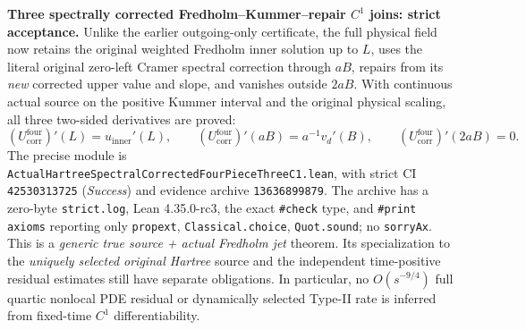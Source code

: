 \documentclass[11pt]{amsart}
\begin{document}
\medskip
\noindent\textbf{Three spectrally corrected Fredholm--Kummer--repair
$C^1$ joins: strict acceptance.}
Unlike the earlier outgoing-only certificate, the full physical field
now retains the original weighted Fredholm inner solution up to $L$,
uses the literal original zero-left Cramer spectral correction through
$aB$, repairs from its \emph{new} corrected upper value and slope, and
vanishes outside $2aB$. With continuous actual source on the positive
Kummer interval and the original physical scaling, all three
two-sided derivatives are proved:
\[
 \left(U_{\mathrm{corr}}^{\mathrm{four}}\right)'(L)
    =u_{\mathrm{inner}}'(L),\qquad
 \left(U_{\mathrm{corr}}^{\mathrm{four}}\right)'(aB)
    =a^{-1}v_d'(B),\qquad
 \left(U_{\mathrm{corr}}^{\mathrm{four}}\right)'(2aB)=0.
\]
The precise module is
\texttt{ActualHartreeSpectralCorrectedFourPieceThreeC1.lean},
with strict CI \texttt{42530313725} (\emph{Success})
and evidence archive \texttt{13636899879}. The archive has a
zero-byte \texttt{strict.log}, Lean 4.35.0-rc3, the exact
\texttt{\#check} type, and \texttt{\#print axioms} reporting only
\texttt{propext}, \texttt{Classical.choice},
\texttt{Quot.sound}; no \texttt{sorryAx}.
This is a \emph{generic true source + actual Fredholm jet} theorem.
Its specialization to the \emph{uniquely selected original Hartree}
source and the independent time-positive residual estimates still
have separate obligations. In particular, no $O(s^{-9/4})$ full
quartic nonlocal PDE residual or dynamically selected Type-II rate
is inferred from fixed-time $C^1$ differentiability.
\end{document}
